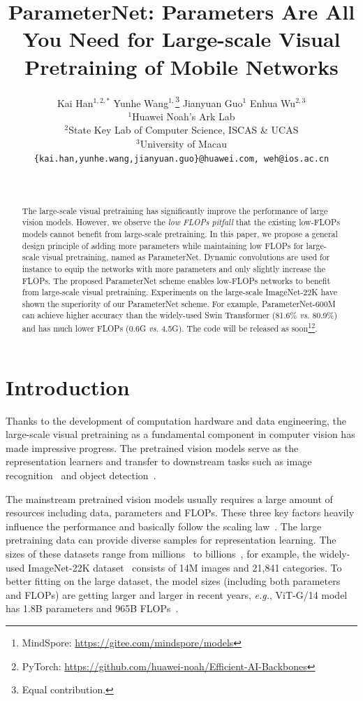\documentclass{article}
\title{\Large\textbf{ParameterNet: Parameters Are All You Need for Large-scale Visual Pretraining of Mobile Networks}}
\author{
\begin{minipage}{\linewidth}
\begin{center}
\normalsize Kai Han$^{1,2,*}$ \hspace{0.23cm} Yunhe Wang$^{1,}$\footnote{Equal contribution.} \hspace{0.23cm} Jianyuan Guo$^{1}$ \hspace{0.23cm} Enhua Wu$^{2,3}$ \\[0.2cm] 
{\normalsize$^1$Huawei Noah's Ark Lab}\\
{\normalsize$^2$State Key Lab of Computer Science, ISCAS \& UCAS}\\
{\normalsize$^3$University of Macau}\\
{\small\texttt{\{kai.han,yunhe.wang,jianyuan.guo\}@huawei.com, weh@ios.ac.cn}}\\
\end{center}
\end{minipage}
}
\date{~}
\newcommand{\eg}{\emph{e.g.}}
\begin{document}
\maketitle

\begin{abstract}
	The large-scale visual pretraining has significantly improve the performance of large vision models. However, we observe the \emph{low FLOPs pitfall} that the existing low-FLOPs models cannot benefit from large-scale pretraining.
	In this paper, we propose a general design principle of adding more parameters while maintaining low FLOPs for large-scale visual pretraining, named as ParameterNet. Dynamic convolutions are used for instance to equip the networks with more parameters and only slightly increase the FLOPs. The proposed ParameterNet scheme enables low-FLOPs networks to benefit from large-scale visual pretraining. Experiments on the large-scale ImageNet-22K have shown the superiority of our ParameterNet scheme. For example, ParameterNet-600M can achieve higher accuracy than the widely-used Swin Transformer (81.6\% \emph{vs.} 80.9\%) and has much lower FLOPs (0.6G \emph{vs.} 4.5G). The code will be released as soon\footnote{MindSpore: \url{https://gitee.com/mindspore/models}}\footnote{PyTorch: \url{https://github.com/huawei-noah/Efficient-AI-Backbones}}.
\end{abstract}

\section{Introduction}
\label{sec:intro}
Thanks to the development of computation hardware and data engineering, the large-scale visual pretraining as a fundamental component in computer vision has made impressive progress. The pretrained vision models serve as the representation learners and transfer to downstream tasks such as image recognition~\cite{vit,efficientnetv2} and object detection~\cite{swin}.

The mainstream pretrained vision models usually requires a large amount of resources including data, parameters and FLOPs. These three key factors heavily influence the performance and basically follow the scaling law~\cite{zhai2022scaling}. The large pretraining data can provide diverse samples for representation learning. The sizes of these datasets range from millions~\cite{imagenet,kuznetsova2020open} to billions~\cite{sun2017revisiting,thomee2015new}, for example, the widely-used ImageNet-22K dataset~\cite{imagenet} consists of 14M images and 21,841 categories. To better fitting on the large dataset, the model sizes (including both parameters and FLOPs) are getting larger and larger in recent years, \eg, ViT-G/14 model has 1.8B parameters and 965B FLOPs~\cite{zhai2022scaling}.
\end{document}
